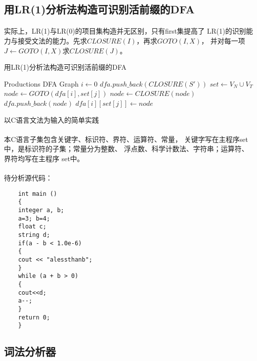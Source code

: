 \documentclass[UTF8]{ctexart}
\makeatletter
\renewcommand{\section}{\@startsection{section}{1}{0mm}
	{-\baselineskip}{0.5\baselineskip}{\bf\leftline}}
\makeatother
\begin{document}
	\subsection{用LR(1)分析法构造可识别活前缀的DFA} %
	\label{sub:lr_dfa}
	\paragraph{} %
	实际上，LR(1)与LR(0)的项目集构造并无区别，只有first集提高了
	LR(1)的识别能力与接受文法的能力。先求$CLOSURE(I)$，再求$GOTO(I, X)$，
	并对每一项$J \leftarrow GOTO(I, X)$求$CLOSURE(J)$。
	\begin{algorithm}
		\caption{用LR(1)分析法构造可识别活前缀的DFA}
		\begin{algorithmic}[1] %
			\Require Productions
			\Ensure DFA Graph
			\State $i \gets 0$
			\State $dfa.push\_back(CLOSURE(S'))$
			\State $set \gets V_N \cup V_T$
			\State $node \gets GOTO(dfa[i], set[j])$
			\State $node \gets CLOSURE(node)$
			\State $dfa.push\_back(node)$
			\EndIf
			\State $dfa[i][set[j]] \gets node$
			\EndFor
			\EndWhile
			\EndFunction
		\end{algorithmic}
	\end{algorithm}
	\section{以C语言文法为输入的简单实践} %
	\label{sec:c_compiler_front}
	\paragraph{} %
	本C语言子集包含关键字、标识符、界符、运算符、常量，
	关键字写在主程序set中，是标识符的子集；常量分为整数、
	浮点数、科学计数法、字符串；运算符、界符均写在主程序
	set中。
	\paragraph{} %
	待分析源代码：
	\begin{lstlisting}
	int main ()
	{
	integer a, b;
	a=3; b=4;
	float c;
	string d;
	if(a - b < 1.0e-6)
	{
	cout << "alessthanb";
	}
	while (a + b > 0)
	{
	cout<<d;
	a--;
	}
	return 0;
	}
	\end{lstlisting}
	\subsection{词法分析器} %
	\label{sub:c_lexical_analyzier}
\end{document}
